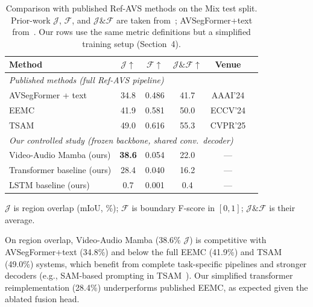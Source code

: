 \documentclass[a4paper,12pt]{extarticle}
\begin{document}
\begin{table}[t]
\centering
\caption{Comparison with published Ref-AVS methods on the Mix test split. Prior-work $\mathcal{J}$, $\mathcal{F}$, and $\mathcal{J}\&\mathcal{F}$ are taken from~\cite{wang2024refavs, tsam2025}; AVSegFormer+text from~\cite{wang2024refavs, avsegformer2023}. Our rows use the same metric definitions but a simplified training setup (Section~4).}
\label{tab:published}
\small
\begin{threeparttable}
\begin{tabular}{lccccl}
\toprule
Method & $\mathcal{J}$$\uparrow$ & $\mathcal{F}$$\uparrow$ & $\mathcal{J}\&\mathcal{F}$$\uparrow$ & Venue \\
\midrule
\multicolumn{6}{l}{\textit{Published methods (full Ref-AVS pipeline)}} \\
AVSegFormer + text~\cite{avsegformer2023} & 34.8 & 0.486 & 41.7 & AAAI'24 \\
EEMC~\cite{wang2024refavs} & 41.9 & 0.581 & 50.0 & ECCV'24 \\
TSAM~\cite{tsam2025} & 49.0 & 0.616 & 55.3 & CVPR'25 \\
\midrule
\multicolumn{6}{l}{\textit{Our controlled study (frozen backbone, shared conv.\ decoder)}} \\
Video-Audio Mamba (ours) & \textbf{38.6} & 0.054 & 22.0 & --- \\
Transformer baseline (ours) & 28.4 & 0.040 & 16.2 & --- \\
LSTM baseline (ours) & 0.7 & 0.001 & 0.4 & --- \\
\bottomrule
\end{tabular}
\begin{tablenotes}
\small
\item $\mathcal{J}$ is region overlap (mIoU, \%); $\mathcal{F}$ is boundary F-score in $[0,1]$; $\mathcal{J}\&\mathcal{F}$ is their average.
\end{tablenotes}
\end{threeparttable}
\end{table}

On region overlap, Video-Audio Mamba (38.6\% $\mathcal{J}$) is competitive with AVSegFormer+text (34.8\%) and below the full EEMC (41.9\%) and TSAM (49.0\%) systems, which benefit from complete task-specific pipelines and stronger decoders (e.g., SAM-based prompting in TSAM~\cite{tsam2025}). Our simplified transformer reimplementation (28.4\%) underperforms published EEMC, as expected given the ablated fusion head.
\end{document}
